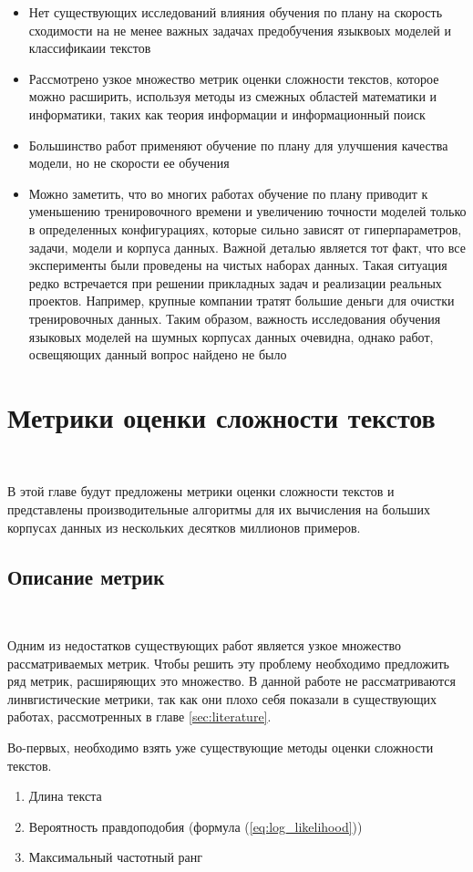 \documentclass{spbau-diploma}
\begin{document}
\begin{itemize}
	\item Нет существующих исследований влияния обучения по плану на скорость сходимости на не менее важных задачах предобучения языквоых моделей и классификаии текстов
	\item Рассмотрено узкое множество метрик оценки сложности текстов, которое можно расширить, используя методы из смежных областей математики и информатики, таких как теория информации и информационный поиск
	\item Большинство работ применяют обучение по плану для улучшения качества модели, но не скорости ее обучения
	\item Можно заметить, что во многих работах обучение по плану приводит к уменьшению тренировочного времени и увеличению точности моделей только в определенных конфигурациях, которые сильно зависят от гиперпараметров, задачи, модели и корпуса данных. Важной деталью является тот факт, что все эксперименты были проведены на чистых наборах данных. Такая ситуация редко встречается при решении прикладных задач и реализации реальных проектов. Например, крупные компании тратят большие деньги для очистки тренировочных данных. Таким образом, важность исследования обучения языковых моделей на шумных корпусах данных очевидна, однако работ, освещяющих данный вопрос найдено не было
\end{itemize}

\section{Метрики оценки сложности текстов} \label{sec:metrics}
\ 

В этой главе будут предложены метрики оценки сложности текстов и представлены производительные алгоритмы для их вычисления на больших корпусах данных из нескольких десятков миллионов примеров.

\subsection{Описание метрик}
\ 

Одним из недостатков существующих работ является узкое множество рассматриваемых метрик. Чтобы решить эту проблему необходимо предложить ряд метрик, расширяющих это множество. В данной работе не рассматриваются линвгистические метрики, так как они плохо себя показали в существующих работах, рассмотренных в главе \ref{sec:literature}.

Во-первых, необходимо взять уже существующие методы оценки сложности текстов.
\begin{enumerate}
	\item Длина текста
	\item Вероятность правдоподобия (формула (\ref{eq:log_likelihood}))
	\item Максимальный частотный ранг
\end{enumerate}
\end{document}
